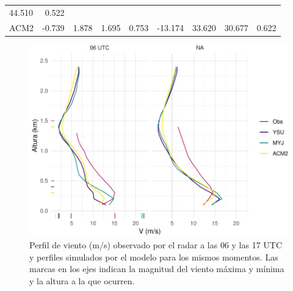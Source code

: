 \documentclass[12pt,spanish,oneside, a4paper]{book}
\begin{document}
\begin{table}
\begin{tabular}[t]{lrrrrrrrr}
 44.510 & 0.522\\
ACM2 & -0.739 & 1.878 & 1.695 & 0.753 & -13.174 & 33.620 & 30.677 & 0.622\\
\bottomrule
\end{tabular}
\end{table}

\begin{figure}

{\centering \includegraphics{00_Paper_files/figure-latex/perfiles-mod-1} 

}

\caption{Perfil de viento (m/s) observado por el radar a las 06 y las 17 UTC y perfiles simulados por el modelo para los mismos momentos. Las marcas en los ejes indican la magnitud del viento máxima y mínima y la altura a la que ocurren. \label{perfil-mod}}\label{fig:perfiles-mod}
\end{figure}
\end{document}
